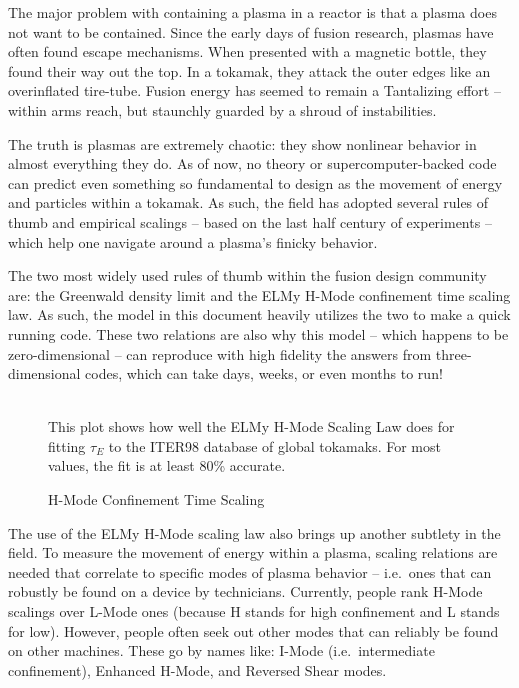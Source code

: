 The major problem with containing a plasma in a reactor is that a plasma does not want to be contained. Since the early days of fusion research, plasmas have often found escape mechanisms. When presented with a magnetic bottle, they found their way out the top. In a tokamak, they attack the outer edges like an overinflated tire-tube. Fusion energy has seemed to remain a Tantalizing effort -- within arms reach, but staunchly guarded by a shroud of instabilities.

The truth is plasmas are extremely chaotic: they show nonlinear behavior in almost everything they do. As of now, no theory or supercomputer-backed code can predict even something so fundamental to design as the movement of energy and particles within a tokamak. As such, the field has adopted several rules of thumb and empirical scalings -- based on the last half century of experiments -- which help one navigate around a plasma's finicky behavior.

The two most widely used rules of thumb within the fusion design community are: the Greenwald density limit and the ELMy H-Mode confinement time scaling law. As such, the model in this document heavily utilizes the two to make a quick running code. These two relations are also why this model -- which happens to be zero-dimensional -- can reproduce with high fidelity the answers from three-dimensional codes, which can take days, weeks, or even months to run!

\begin{figure}
	\centering
	\begin{adjustbox}{width=0.75\textwidth}
		
	\end{adjustbox}
	\caption{H-Mode Confinement Time Scaling} ~\\
	\small This plot shows how well the ELMy H-Mode Scaling Law does for fitting $\tau_E$ to the ITER98 database of global tokamaks. For most values, the fit is at least 80\% accurate.
	\label{fig:elmy}
\end{figure}

The use of the ELMy H-Mode scaling law also brings up another subtlety in the field. To measure the movement of energy within a plasma, scaling relations are needed that correlate to specific modes of plasma behavior -- i.e.\ ones that can robustly be found on a device by technicians. Currently, people rank H-Mode scalings over L-Mode ones (because H stands for high confinement and L stands for low). However, people often seek out other modes that can reliably be found on other machines. These go by names like: I-Mode (i.e.\ intermediate confinement), Enhanced H-Mode, and Reversed Shear modes. \cite{imode,enhanced,shear}

